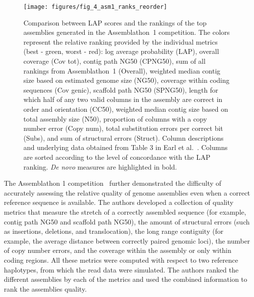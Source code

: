 \documentclass[12pt,\mydriver]{thesis}
\begin{document}
\begin{figure}[ht!]
\begin{center}
\texttt{[image: figures/fig\_4\_asm1\_ranks\_reorder]}
\end{center}
\renewcommand{\baselinestretch}{1}
\small\normalsize
\begin{quote}
\caption[Comparison between LAP scores and the rankings of the
    top assemblies generated in the Assemblathon~1 competition.]
    {Comparison between LAP scores and the rankings of the
    top assemblies generated in the Assemblathon~1 competition.
    The
    colors represent the relative ranking provided by the individual
    metrics (best - green, worst - red):
    log average probability (LAP),
    overall coverage (Cov tot),
    contig path NG50 (CPNG50),
    sum of all rankings from Assemblathon~1 (Overall),
    weighted median contig size based on estimated genome size (NG50),
    coverage within coding sequences (Cov genic),
    scaffold path NG50 (SPNG50),
    length for which half of any two valid columns in the assembly are correct in order and orientation (CC50),
    weighted median contig size based on total assembly size (N50),
    proportion of columns with a copy number error (Copy num),
    total substitution errors per correct bit (Subs),
    and sum of structural errors (Struct).
    Column descriptions and underlying data
    obtained from Table 3 in Earl et al.~\cite{earl2011assemblathon}.
    Columns are sorted according to the level of concordance with the
   LAP ranking.  \emph{De novo} measures are highlighted in bold.}
\label{fig:asm1_ranks}
\end{quote}
\end{figure}
\renewcommand{\baselinestretch}{2}
\small\normalsize

The Assemblathon 1 competition~\cite{earl2011assemblathon} further demonstrated the difficulty of accurately assessing the relative quality of genome
assemblies even when a correct reference sequence is available.
The authors developed a collection of quality metrics that measure the
stretch of a correctly assembled sequence (for example, contig path NG50 and scaffold
path NG50), the amount of structural errors (such as insertions,
deletions, and translocation), the long range contiguity (for example, the
average distance between correctly paired genomic loci), the number of copy number
errors, and the coverage within the assembly or only within coding
regions.  All these metrics were computed with respect to two
reference haplotypes, from which the read data were
simulated.  The authors ranked the different assemblies by each of the metrics and used the combined information to rank the
assemblies quality.
\end{document}
